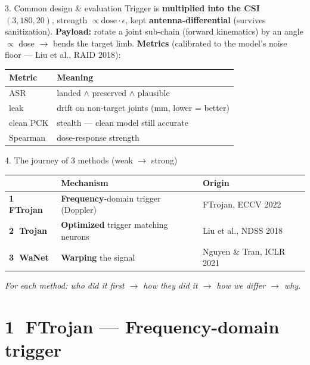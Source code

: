 \documentclass[aspectratio=169,10pt]{beamer}
\newcommand{\acc}[1]{\textcolor{accent}{\textbf{#1}}}
\begin{document}
\begin{frame}{3. Common design \& evaluation}
  Trigger is \textbf{multiplied into the CSI} $(3,180,20)$, strength $\propto \text{dose}\cdot\epsilon$, kept \acc{antenna-differential} (survives sanitization).
  \vfill
  \textbf{Payload:} rotate a joint sub-chain (forward kinematics) by an angle $\propto$ dose $\to$ bends the target limb.
  \vfill
  \textbf{Metrics} (calibrated to the model's noise floor --- Liu et al., RAID 2018):
  \begin{center}
  \begin{tabular}{ll}
    \toprule
    \textbf{Metric} & \textbf{Meaning} \\
    \midrule
    ASR & landed $\wedge$ preserved $\wedge$ plausible \\
    leak & drift on non-target joints (mm, lower = better) \\
    clean PCK & stealth --- clean model still accurate \\
    Spearman & dose-response strength \\
    \bottomrule
  \end{tabular}
  \end{center}
\end{frame}

\begin{frame}{4. The journey of 3 methods (weak $\to$ strong)}
  \begin{center}
  \begin{tabular}{lll}
    \toprule
     & \textbf{Mechanism} & \textbf{Origin} \\
    \midrule
    \textbf{\textcircled{1} FTrojan} & \textbf{Frequency}-domain trigger (Doppler) & FTrojan, ECCV 2022 \\
    \textbf{\textcircled{2} Trojan}  & \textbf{Optimized} trigger matching neurons & Liu et al., NDSS 2018 \\
    \textbf{\textcircled{3} WaNet}   & \textbf{Warping} the signal & Nguyen \& Tran, ICLR 2021 \\
    \bottomrule
  \end{tabular}
  \end{center}
  \vfill
  \centering\emph{For each method: who did it first $\to$ how they did it $\to$ how we differ $\to$ why.}
\end{frame}

\section{\textcircled{1} FTrojan --- Frequency-domain trigger}
\end{document}
